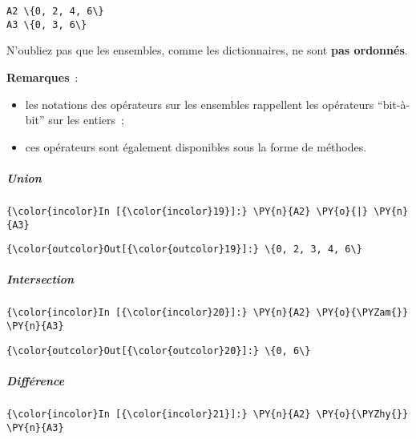    \begin{Verbatim}[commandchars=\\\{\}]
A2 \{0, 2, 4, 6\}
A3 \{0, 3, 6\}

    \end{Verbatim}

    N'oubliez pas que les ensembles, comme les dictionnaires, ne sont
\textbf{pas ordonnés}.

    \textbf{Remarques}~:

\begin{itemize}
\tightlist
\item
  les notations des opérateurs sur les ensembles rappellent les
  opérateurs ``bit-à-bit'' sur les entiers~;
\item
  ces opérateurs sont également disponibles sous la forme de méthodes.
\end{itemize}

    \hypertarget{union}{%
\subparagraph{Union}\label{union}}

    \begin{Verbatim}[commandchars=\\\{\}]
{\color{incolor}In [{\color{incolor}19}]:} \PY{n}{A2} \PY{o}{|} \PY{n}{A3}
\end{Verbatim}


\begin{Verbatim}[commandchars=\\\{\}]
{\color{outcolor}Out[{\color{outcolor}19}]:} \{0, 2, 3, 4, 6\}
\end{Verbatim}
            
    \hypertarget{intersection}{%
\subparagraph{Intersection}\label{intersection}}

    \begin{Verbatim}[commandchars=\\\{\}]
{\color{incolor}In [{\color{incolor}20}]:} \PY{n}{A2} \PY{o}{\PYZam{}} \PY{n}{A3}
\end{Verbatim}


\begin{Verbatim}[commandchars=\\\{\}]
{\color{outcolor}Out[{\color{outcolor}20}]:} \{0, 6\}
\end{Verbatim}
            
    \hypertarget{diffuxe9rence}{%
\subparagraph{Différence}\label{diffuxe9rence}}

    \begin{Verbatim}[commandchars=\\\{\}]
{\color{incolor}In [{\color{incolor}21}]:} \PY{n}{A2} \PY{o}{\PYZhy{}} \PY{n}{A3}
\end{Verbatim}


